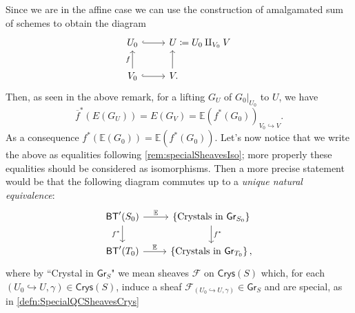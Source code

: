 \documentclass[../Main]{subfiles}
\begin{document}
\begin{rem}
	Since we are in the affine case we can use the construction of amalgamated
	sum of schemes to obtain the diagram
	\begin{equation*}
	\begin{tikzcd}[/tikz/column 2/.append style={anchor=base west}]
		U_0 \arrow[r, "", hookrightarrow] &
		U \coloneqq U_0 \amalg_{V_0} V \\
		V_0 \arrow[u, "f", rightarrow] 
		\arrow[r, "", hookrightarrow] &
		V \arrow[u, "", rightarrow, end anchor={[xshift=1.84ex,yshift=0.29ex]south west},
		start anchor={[xshift=0.38ex]}] 
	.\end{tikzcd}
	\end{equation*}
	Then, as seen in the above remark, for a lifting $G_U$ 
	of $\left.G_0\right|_{U_0}$ to $U$, we have
	\begin{equation*}
		\overline{f}^* \left( E(G_U) \right) =
		E(G_V) = \mathbb{E} \left( f^* (G_0) \right)_{V_0 \hookrightarrow V}
	.\end{equation*}
	As a consequence $f^* \left( \mathbb{E}(G_0) \right) =
	\mathbb{E}\left( f^*(G_0) \right)$.
	Let's now notice that we write the above as equalities following \cref{rem:specialSheavesIso};
	more properly these equalities should be considered as isomorphisms.
	Then a more precise statement would be that the following diagram
	commutes up to a {\em unique natural equivalence}:
	\begin{equation*}
	\begin{tikzcd}
		\mathsf{BT}'(S_0)
		\arrow[r, "\mathbb{E}", rightarrow] 
		\arrow[d, "f^*"', rightarrow] &
		\left\{ \text{Crystals in } \mathsf{Gr}_{S_0} \right\}
		\arrow[d, "f^*", rightarrow] \\
		\mathsf{BT}'(T_0) \arrow[r, "\mathbb{E}", rightarrow] &
		\left\{ \text{Crystals in } \mathsf{Gr}_{T_0} \right\}
	,\end{tikzcd}
	\end{equation*}
	where by ``Crystal in $\mathsf{Gr}_S$" we mean sheaves $\mathscr{F}$ on $\mathsf{Crys}(S)$
	which, for each $\left(U_0 \hookrightarrow U, \gamma\right) \in \mathsf{Crys}(S)$,
	induce a sheaf $\mathscr{F}_{\left(U_0 \hookrightarrow U, \gamma\right)} \in \mathsf{Gr}_S$
	and are special, as in \cref{defn:SpecialQCSheavesCrys}
\end{rem}
\end{document}
